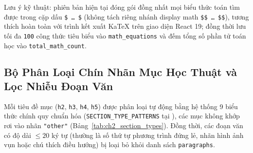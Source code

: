 Lưu ý kỹ thuật: phiên bản hiện tại đóng gói đồng nhất mọi biểu thức toán tìm được trong cặp dấu \texttt{\$ \ldots\ \$} (không tách riêng nhánh display math \texttt{\$\$ \ldots\ \$\$}), tương thích hoàn toàn với trình kết xuất KaTeX trên giao diện React 19; đồng thời lưu tối đa \texttt{100} công thức tiêu biểu vào \texttt{math\_equations} và đếm tổng số phần tử toán học vào \texttt{total\_math\_count}.

\subsection{Bộ Phân Loại Chín Nhãn Mục Học Thuật và Lọc Nhiễu Đoạn Văn}
\label{sec:ch2_section_classifier}

Mỗi tiêu đề mục (\texttt{h2}, \texttt{h3}, \texttt{h4}, \texttt{h5}) được phân loại tự động bằng hệ thống 9 biểu thức chính quy chuẩn hóa (\texttt{SECTION\_TYPE\_PATTERNS} tại ), các mục không khớp rơi vào nhãn \texttt{"other"} (Bảng~\ref{tab:ch2_section_types}). Đồng thời, các đoạn văn có độ dài $\le 20$ ký tự (thường là số thứ tự phương trình đứng lẻ, nhãn hình ảnh vụn hoặc chú thích điều hướng) bị loại bỏ khỏi danh sách \texttt{paragraphs}.

